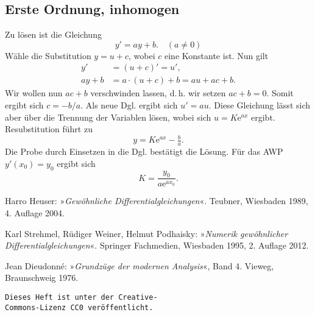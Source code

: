 \documentclass[a4paper,10pt,fleqn,twocolumn,twoside,openany]{scrartcl}
\numberwithin{equation}{section}
\newcommand{\ee}{\mathrm e}
\theoremstyle{definition}
\begin{document}
\subsection{Erste Ordnung, inhomogen}
Zu lösen ist die Gleichung
\begin{equation}
y' = ay+b.\quad (a\ne 0)
\end{equation}
Wähle die Substitution $y=u+c$, wobei
$c$ eine Konstante ist. Nun gilt
\begin{align}
y' &= (u+c)' = u',\\
ay+b &= a\cdot (u+c)+b = au+ac+b.
\end{align}
Wir wollen nun $ac+b$ verschwinden lassen, d.\,h. wir setzen
$ac+b=0$. Somit ergibt sich $c=-b/a$. Als neue Dgl. ergibt sich
$u' = au$. Diese Gleichung lässt sich aber über die Trennung
der Variablen lösen, wobei sich $u=K\ee^{ax}$ ergibt. Resubstitution
führt zu
\begin{equation}
y = K\ee^{ax}-\tfrac{b}{a}.
\end{equation}
Die Probe durch Einsetzen in die Dgl. bestätigt die Lösung.
Für das AWP $y'(x_0)=y_0$ ergibt sich
\begin{equation}
K = \frac{y_0}{a\ee^{ax_0}}.
\end{equation}

\begin{thebibliography}{x}
 Harro Heuser: »\emph{Gewöhnliche
Differentialgleichungen}«. Teubner, Wiesbaden 1989, 4. Auflage 2004.

 Karl Strehmel, Rüdiger Weiner, Helmut Podhaisky:
»\emph{Numerik gewöhnlicher Differentialgleichungen}«. Springer
Fachmedien, Wiesbaden 1995, 2. Auflage 2012.

 Jean Dieudonné:
»\emph{Grundzüge der modernen Analysis}«, Band 4.
Vieweg, Braunschweig 1976.
\end{thebibliography}

\vfill
\noindent
\texttt{Dieses Heft ist unter der Creative-\\
Commons-Lizenz CC0 veröffentlicht.}
\end{document}
